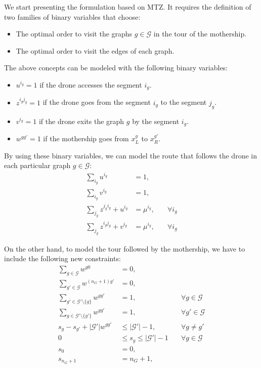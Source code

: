 We start presenting the formulation based on MTZ. It requires the definition of two families of binary variables that choose:
\begin{itemize}
    \item The optimal order to visit the  graphs $g\in\mathcal G$ in the tour of the mothership.
    \item The optimal order to visit the edges of each graph.
\end{itemize}

The above concepts can be modeled with the following binary variables:
\begin{itemize}
    \item $u^{i_g} = 1$ if the drone accesses the segment $i_g$.
    \item $z^{i_gj_g} = 1$ if the drone goes from the segment $i_g$ to the segment $j_g$.
    \item $v^{i_g} = 1$ if the drone exits the graph  $g$ by the segment $i_g$.
    \item $w^{gg'} = 1$ if the mothership goes from $x_L^g$ to $x_R^{g'}$.
\end{itemize}

By using these binary variables, we can model the route that follows the drone in each particular graph $g\in \mathcal G$:
\begin{align}
    \sum_{i_g} u^{i_g} & = 1, \label{DEnt2}\\%
    \sum_{i_g} v^{i_g} & = 1, \label{DExt}\\%
    \sum_{j_g} z^{j_gi_g} + u^{i_g} & = \mu^{i_g}, &\quad\forall i_g \label{DInu}\\
    \sum_{j_g} z^{i_gj_g} + v^{i_g} & = \mu^{i_g}, &\quad\forall i_g \label{DInv2}
\end{align}

On the other hand, to model the tour followed by the mothership, we have to include the following new constraints:
\begin{align}
    \sum_{g\in\mathcal G} w^{g0} & = 0, \label{Torigin}\\
    \sum_{g'\in\mathcal G} w^{(n_G+1) g'} & = 0, \label{TDest}\\
    \sum_{g'\in\mathcal G'\setminus\{g\}} w^{gg'} & = 1, \label{TExt} &\quad\forall g\in \mathcal G\\
    \sum_{g\in\mathcal G'\setminus\{g'\}} w^{gg'} & = 1, &\quad\forall g'\in \mathcal G\label{TEnt}\\
    s_g - s_{g'} + |\mathcal G'|w^{gg'} & \leq |\mathcal G'| - 1  , &\quad\forall g \neq g' \tag{MTZ$_3$} \label{MTZ3}\\
    0 & \leq s_g \leq |\mathcal G'| - 1 &\quad\forall g\in \mathcal G\tag{MTZ$_4$}\label{MTZ4}\\
    s_0 & = 0, \tag{MTZ$_5$}\label{MTZ5}\\
    s_{n_G+1}&=n_G+1, \tag{MTZ$_6$}\label{MTZ6}
\end{align}

